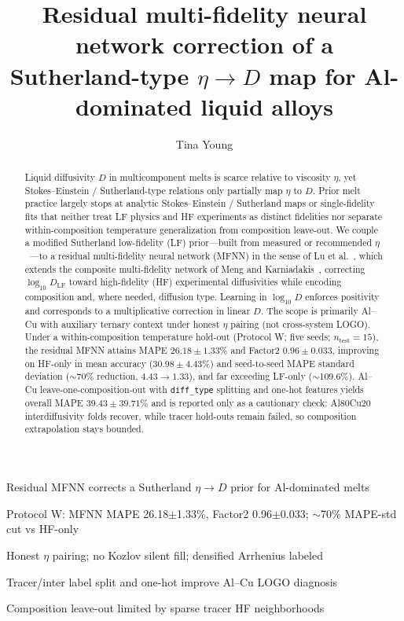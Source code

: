 \documentclass[review,12pt]{elsarticle}
\begin{document}
\begin{frontmatter}

\title{Residual multi-fidelity neural network correction of a Sutherland-type $\eta\to D$ map for Al-dominated liquid alloys}

\author[a]{Tina Young}

\address[a]{Affiliation TBD}

\begin{abstract}
Liquid diffusivity $D$ in multicomponent melts is scarce relative to viscosity $\eta$, yet Stokes--Einstein / Sutherland-type relations only partially map $\eta$ to $D$. Prior melt practice largely stops at analytic Stokes--Einstein / Sutherland maps or single-fidelity fits that neither treat LF physics and HF experiments as distinct fidelities nor separate within-composition temperature generalization from composition leave-out. We couple a modified Sutherland low-fidelity (LF) prior---built from measured or recommended $\eta$~\cite{assael2006,schick2012,tang2015}---to a residual multi-fidelity neural network (MFNN) in the sense of Lu et al.~\cite{lu2020pnas}, which extends the composite multi-fidelity network of Meng and Karniadakis~\cite{meng2020jcp}, correcting $\log_{10} D_{\mathrm{LF}}$ toward high-fidelity (HF) experimental diffusivities while encoding composition and, where needed, diffusion type. Learning in $\log_{10} D$ enforces positivity and corresponds to a multiplicative correction in linear $D$. The scope is primarily Al--Cu with auxiliary ternary context under honest $\eta$ pairing (not cross-system LOGO). Under a within-composition temperature hold-out (Protocol W; five seeds; $n_{\mathrm{test}}=15$), the residual MFNN attains MAPE $26.18\pm 1.33\%$ and Factor2 $0.96\pm 0.033$, improving on HF-only in mean accuracy ($30.98\pm 4.43\%$) and seed-to-seed MAPE standard deviation ($\sim$70\% reduction, $4.43\to 1.33$), and far exceeding LF-only ($\sim$109.6\%). Al--Cu leave-one-composition-out with \texttt{diff\_type} splitting and one-hot features yields overall MAPE $39.43\pm 39.71\%$ and is reported only as a cautionary check: Al80Cu20 interdiffusivity folds recover, while tracer hold-outs remain failed, so composition extrapolation stays bounded.
\end{abstract}

\begin{highlights}
\item Residual MFNN corrects a Sutherland $\eta\to D$ prior for Al-dominated melts
\item Protocol W: MFNN MAPE 26.18$\pm$1.33\%, Factor2 0.96$\pm$0.033; $\sim$70\% MAPE-std cut vs HF-only
\item Honest $\eta$ pairing; no Kozlov silent fill; densified Arrhenius labeled
\item Tracer/inter label split and one-hot improve Al--Cu LOGO diagnosis
\item Composition leave-out limited by sparse tracer HF neighborhoods
\end{highlights}


\end{frontmatter}
\end{document}
